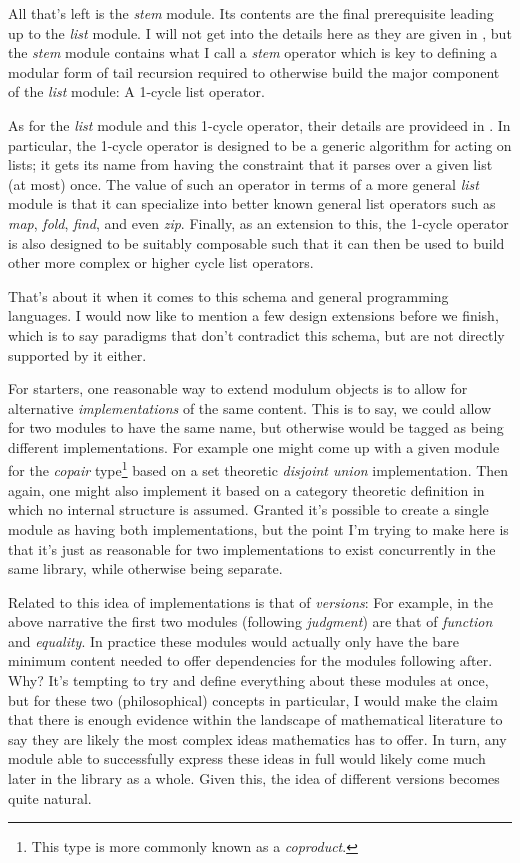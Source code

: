 \documentclass[twoside]{article}
\begin{document}
All that's left is the \emph{stem} module. Its contents are the final prerequisite leading up to the \emph{list} module.
I will not get into the details here as they are given in \cite{nikfi}, but the \emph{stem} module contains what I call
a \emph{stem} operator which is key to defining a modular form of tail recursion required to otherwise build the major
component of the \emph{list} module: A 1-cycle list operator.

As for the \emph{list} module and this 1-cycle operator, their details are provideed in \cite{nikli}. In particular, the
1-cycle operator is designed to be a generic algorithm for acting on lists; it gets its name from having the constraint
that it parses over a given list (at most) once. The value of such an operator in terms of a more general \emph{list}
module is that it can specialize into better known general list operators such as \emph{map}, \emph{fold}, \emph{find},
and even \emph{zip}. Finally, as an extension to this, the 1-cycle operator is also designed to be suitably composable
such that it can then be used to build other more complex or higher cycle list operators.

That's about it when it comes to this schema and general programming languages. I would now like to mention a few design
extensions before we finish, which is to say paradigms that don't contradict this schema, but are not directly supported
by it either.

For starters, one reasonable way to extend modulum objects is to allow for alternative \emph{implementations} of the same
content. This is to say, we could allow for two modules to have the same name, but otherwise would be tagged as being
different implementations. For example one might come up with a given module for the \emph{copair} type\footnote{This type
is more commonly known as a \emph{coproduct}.} based on a set theoretic \emph{disjoint union} implementation. Then again,
one might also implement it based on a category theoretic definition in which no internal structure is assumed. Granted
it's possible to create a single module as having both implementations, but the point I'm trying to make here is that it's
just as reasonable for two implementations to exist concurrently in the same library, while otherwise being separate.

Related to this idea of implementations is that of \emph{versions}: For example, in the above narrative the first two modules
(following \emph{judgment}) are that of \emph{function} and \emph{equality}. In practice these modules would actually only
have the bare minimum content needed to offer dependencies for the modules following after. Why? It's tempting to try and
define everything about these modules at once, but for these two (philosophical) concepts in particular, I would make the
claim that there is enough evidence within the landscape of mathematical literature to say they are likely the most complex
ideas mathematics has to offer. In turn, any module able to successfully express these ideas in full would likely come
much later in the library as a whole. Given this, the idea of different versions becomes quite natural.
\end{document}
